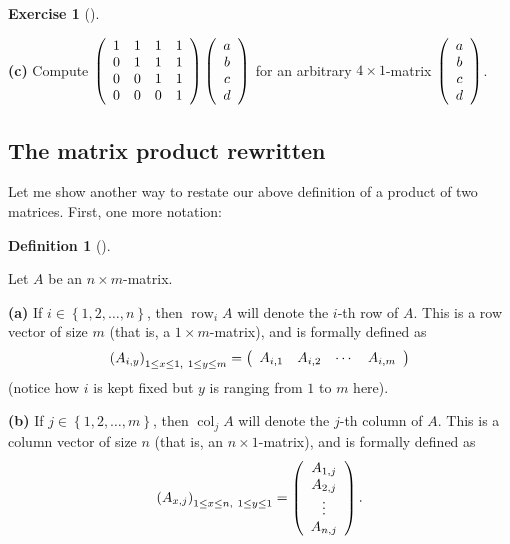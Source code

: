 \documentclass[numbers=enddot,12pt,final,onecolumn,notitlepage]{scrartcl}%
\theoremstyle{definition}
\newtheorem{defi}[theo]{Definition}
\newenvironment{definition}[1][]
{\begin{defi}[#1]\begin{leftbar}}
{\end{leftbar}\end{defi}}
\newtheorem{exmp}[theo]{Exercise}
\newenvironment{exercise}[1][]
{\begin{exmp}[#1]\begin{leftbar}}
{\end{leftbar}\end{exmp}}
\begin{document}
\begin{exercise}
\textbf{(c)} Compute $\left(
\begin{array}
[c]{cccc}%
1 & 1 & 1 & 1\\
0 & 1 & 1 & 1\\
0 & 0 & 1 & 1\\
0 & 0 & 0 & 1
\end{array}
\right)  \left(
\begin{array}
[c]{c}%
a\\
b\\
c\\
d
\end{array}
\right)  $ for an arbitrary $4\times1$-matrix $\left(
\begin{array}
[c]{c}%
a\\
b\\
c\\
d
\end{array}
\right)  $.
\end{exercise}

\subsection{The matrix product rewritten}

Let me show another way to restate our above definition of a product of two
matrices. First, one more notation:

\begin{definition}
Let $A$ be an $n\times m$-matrix.

\textbf{(a)} If $i\in\left\{  1,2,\ldots,n\right\}  $, then
$\operatorname*{row}\nolimits_{i}A$ will denote the $i$-th row of $A$. This is
a row vector of size $m$ (that is, a $1\times m$-matrix), and is formally
defined as
\[
\left(  A_{i,y}\right)  _{1\leq x\leq1,\ 1\leq y\leq m}=\left(
\begin{array}
[c]{cccc}%
A_{i,1} & A_{i,2} & \cdots & A_{i,m}%
\end{array}
\right)
\]
(notice how $i$ is kept fixed but $y$ is ranging from $1$ to $m$ here).

\textbf{(b)} If $j\in\left\{  1,2,\ldots,m\right\}  $, then
$\operatorname*{col}\nolimits_{j}A$ will denote the $j$-th column of $A$. This
is a column vector of size $n$ (that is, an $n\times1$-matrix), and is
formally defined as
\[
\left(  A_{x,j}\right)  _{1\leq x\leq n,\ 1\leq y\leq1}=\left(
\begin{array}
[c]{c}%
A_{1,j}\\
A_{2,j}\\
\vdots\\
A_{n,j}%
\end{array}
\right)  .
\]

\end{definition}
\end{document}
